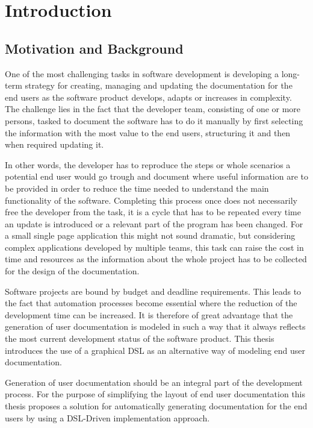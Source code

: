 \chapter{Introduction}
\section{Motivation and Background}
One of the most challenging tasks in software development is developing a long-term strategy for creating, managing and updating the documentation for the end users as the software product develops, adapts or increases in complexity. The challenge lies in the fact that the developer team, consisting of one or more persons, tasked to document the software has to do it manually by first selecting the information with the most value to the end users, structuring it and then when required updating it.

In other words, the developer has to reproduce the steps or whole scenarios a potential end user would go trough and document where useful information are to be provided in order to reduce the time needed to understand the main functionality of the software. Completing this process once does not necessarily free the developer from the task, it is a cycle that has to be repeated every time an update is introduced or a relevant part of the program has been changed. For a small single page application this might not sound dramatic, but considering complex applications developed by multiple teams, this task can raise the cost in time and resources as the information about the whole project has to be collected for the design of the documentation\cite{5712775}.

Software projects are bound by budget and deadline requirements. This leads to the fact that automation processes become essential where the reduction of the development time can be increased. It is therefore of great advantage that the generation of user documentation is modeled in such a way that it always reflects the most current development status of the software product. This thesis introduces the use of a graphical DSL as an alternative way of modeling end user documentation.

Generation of user documentation should be an integral part of the development process. For the purpose of simplifying the layout of end user documentation this thesis proposes a solution for automatically generating documentation for the end users by using a DSL-Driven implementation approach.

